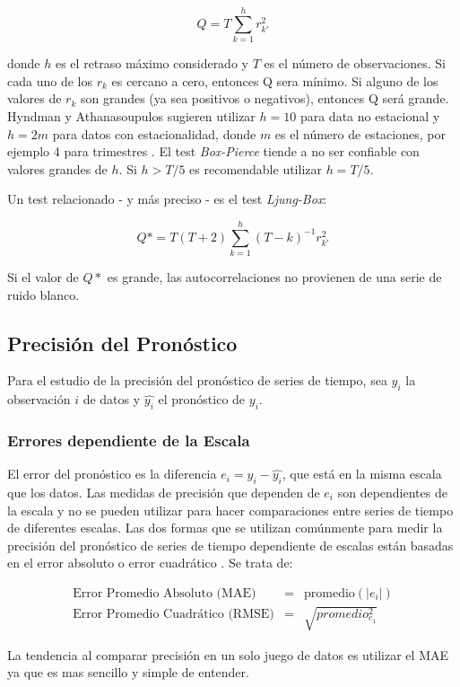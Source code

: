 \[ Q = T \sum_{k=1}^{h}r_{k\prime}^2 \]

donde $h$ es el retraso máximo considerado y $T$ es el número de observaciones. Si cada uno de los $r_k$ es cercano a cero, entonces Q sera mínimo. Si alguno de los valores de $r_k$ son grandes (ya sea positivos o negativos), entonces Q será grande. Hyndman y Athanasoupulos sugieren utilizar $h = 10$ para data no estacional y $h = 2m$ para datos con estacionalidad, donde $m$ es el número de estaciones, por ejemplo 4 para trimestres \cite{hyndman}.  El test \emph{Box-Pierce} tiende a no ser confiable con valores grandes de $h$. Si $h > T/5$ es recomendable utilizar $h=T/5$.

Un test relacionado - y más preciso - es el test \emph{Ljung-Box}:

\[ Q* = T(T+2) \sum_{k=1}^{h}(T-k)^{-1}r_{k\prime}^{2} \]

Si el valor de $Q*$ es grande, las autocorrelaciones no provienen de una serie de ruido blanco. 

\subsection{Precisión del Pronóstico}
Para el estudio de la precisión del pronóstico de series de tiempo, sea $y_i$ la observación $i$ de datos y $\hat{y_i}$ el pronóstico de $y_i$.

\subsubsection{Errores dependiente de la Escala}
El error del pronóstico es la diferencia $e_i = y_i - \hat{y_i}$, que está en la misma escala que los datos. Las medidas de precisión que dependen de $e_i$ son dependientes de la escala y no se pueden utilizar para hacer comparaciones entre series de tiempo de diferentes escalas. Las dos formas que se utilizan comúnmente para medir la precisión del pronóstico de series de tiempo dependiente de escalas están basadas en el error absoluto o error cuadrático \cite{hyndman}. Se trata de:

\begin{eqnarray*}
	\text{Error Promedio Absoluto (MAE)}& = &\text{promedio}(|e_{i}|) \\
	\text{Error Promedio Cuadrático (RMSE)}& = &\sqrt{promedio_{e_1}^2} 
\end{eqnarray*}

La tendencia al comparar precisión en un solo juego de datos es utilizar el MAE ya que es mas sencillo y simple de entender. 

